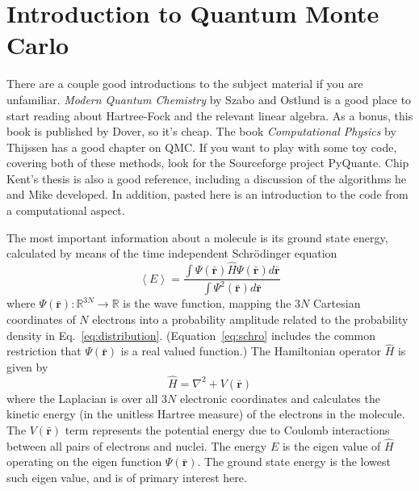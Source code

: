 \documentclass[11pt]{article}
\begin{document}
\section{Introduction to Quantum Monte Carlo}
There are a couple good introductions to the subject material if you are unfamiliar.
\emph{Modern Quantum Chemistry} by Szabo and Ostlund\cite{Szabo82} is a good place to start
reading about Hartree-Fock and the relevant linear algebra. As a bonus, this book is published by Dover, so it's cheap.
The book \emph{Computational Physics} by Thijssen\cite{Thijssen99} has a good chapter on QMC. If you want to
play with some toy code, covering both of these methods, look for the Sourceforge project PyQuante. Chip Kent's thesis
is also a good reference\cite{kent2003}, including a discussion of the algorithms he and Mike developed.
In addition, pasted here is an introduction to the code from a computational aspect.

\newcommand\colr{\bar{\bm r}}
The most important information about a molecule is its ground state
energy, calculated by means of the time independent Schr{\"o}dinger
equation
\begin{equation} \label{eq:schro}
\left< E \right> = \frac{ \int \Psi(\colr) \hat{H} \Psi(\colr) d\colr }
{  \int \Psi^2(\colr) d\colr }
\end{equation}
where $\Psi(\colr):\mathbb{R}^{3N} \rightarrow \mathbb{R}$ is the wave
function, mapping the $3N$ Cartesian coordinates of $N$ electrons into
a probability amplitude related to the probability density in
Eq.~\eqref{eq:distribution}.  (Equation~\eqref{eq:schro} includes the
common restriction that $\Psi(\colr)$ is a real valued function.) The
Hamiltonian operator $\hat{H}$ is given by
\begin{equation} \label{eq:hamiltonian}
\hat{H} = \nabla^2 + V(\colr)
\end{equation}
where the Laplacian is over all $3N$ electronic coordinates and
calculates the kinetic energy (in the unitless Hartree measure) of the
electrons in the molecule.  The $V(\colr)$ term represents the
potential energy due to Coulomb interactions between all pairs of
electrons and nuclei. The energy $E$ is the eigen value of $\hat{H}$
operating on the eigen function $\Psi(\colr)$. The ground state energy
is the lowest such eigen value, and is of primary interest here.
\end{document}
